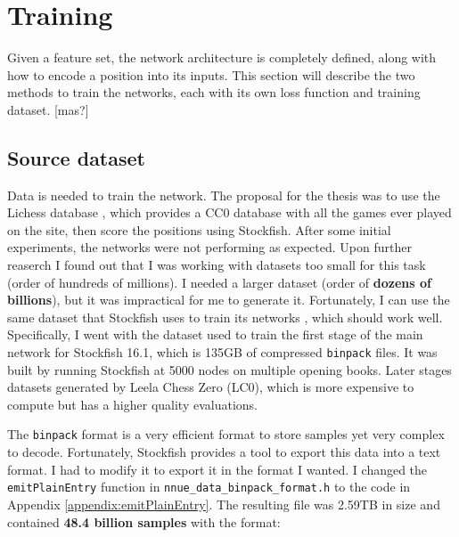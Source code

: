 \section{Training}


Given a feature set, the network architecture is completely defined, along with how to encode a position into its inputs. This section will describe the two methods to train the networks, each with its own loss function and training dataset.
[mas?]

\subsection{Source dataset}

Data is needed to train the network. The proposal for the thesis was to use the Lichess database \cite{lichessdb}, which provides a CC0 database with all the games ever played on the site, then score the positions using Stockfish. After some initial experiments, the networks were not performing as expected. Upon further reaserch I found out that I was working with datasets too small for this task (order of hundreds of millions). I needed a larger dataset (order of \textbf{dozens of billions}), but it was impractical for me to generate it. Fortunately, I can use the same dataset that Stockfish uses to train its networks \cite{sf_nnue_dataset}, which should work well. Specifically, I went with the dataset used to train the first stage of the main network for Stockfish 16.1, which is 135GB of compressed \texttt{binpack} files. It was built by running Stockfish at 5000 nodes on multiple opening books. Later stages datasets generated by Leela Chess Zero (LC0), which is more expensive to compute but has a higher quality evaluations.

The \texttt{binpack} format is a very efficient format to store samples yet very complex to decode. Fortunately, Stockfish provides a tool to export this data into a text format. I had to modify it to export it in the format I wanted. I changed the \texttt{emitPlainEntry} function in \texttt{nnue\_data\_binpack\_format.h} to the code in Appendix \ref{appendix:emitPlainEntry}. The resulting file was 2.59TB in size and contained \textbf{48.4 billion samples} with the format:

